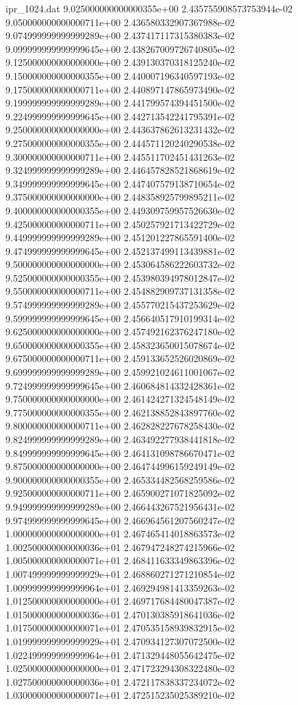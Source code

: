\begin{filecontents}{ipr_1024.dat}
9.025000000000000355e+00 2.435755908573753944e-02
9.050000000000000711e+00 2.436580332907367988e-02
9.074999999999999289e+00 2.437417117315380383e-02
9.099999999999999645e+00 2.438267009726740805e-02
9.125000000000000000e+00 2.439130370318125240e-02
9.150000000000000355e+00 2.440007196340597193e-02
9.175000000000000711e+00 2.440897147865973490e-02
9.199999999999999289e+00 2.441799574394451500e-02
9.224999999999999645e+00 2.442713542241795391e-02
9.250000000000000000e+00 2.443637862613231432e-02
9.275000000000000355e+00 2.444571120240290538e-02
9.300000000000000711e+00 2.445511702451431263e-02
9.324999999999999289e+00 2.446457828521868619e-02
9.349999999999999645e+00 2.447407579138710654e-02
9.375000000000000000e+00 2.448358925799895211e-02
9.400000000000000355e+00 2.449309759957526630e-02
9.425000000000000711e+00 2.450257921713422729e-02
9.449999999999999289e+00 2.451201227865591400e-02
9.474999999999999645e+00 2.452137499113439881e-02
9.500000000000000000e+00 2.453064586222603732e-02
9.525000000000000355e+00 2.453980394978012847e-02
9.550000000000000711e+00 2.454882909737131358e-02
9.574999999999999289e+00 2.455770215437253629e-02
9.599999999999999645e+00 2.456640517910199314e-02
9.625000000000000000e+00 2.457492162376247180e-02
9.650000000000000355e+00 2.458323650015078674e-02
9.675000000000000711e+00 2.459133652526020869e-02
9.699999999999999289e+00 2.459921024611001067e-02
9.724999999999999645e+00 2.460684814332428361e-02
9.750000000000000000e+00 2.461424271324548149e-02
9.775000000000000355e+00 2.462138852843897760e-02
9.800000000000000711e+00 2.462828227678258430e-02
9.824999999999999289e+00 2.463492277938441818e-02
9.849999999999999645e+00 2.464131098786670471e-02
9.875000000000000000e+00 2.464744996159249149e-02
9.900000000000000355e+00 2.465334482568259586e-02
9.925000000000000711e+00 2.465900271071825092e-02
9.949999999999999289e+00 2.466443267521956431e-02
9.974999999999999645e+00 2.466964561207560247e-02
1.000000000000000000e+01 2.467465414018863573e-02
1.002500000000000036e+01 2.467947248274215966e-02
1.005000000000000071e+01 2.468411633349863396e-02
1.007499999999999929e+01 2.468860271271210854e-02
1.009999999999999964e+01 2.469294981413359263e-02
1.012500000000000000e+01 2.469717684480047387e-02
1.015000000000000036e+01 2.470130385918641036e-02
1.017500000000000071e+01 2.470535158939832915e-02
1.019999999999999929e+01 2.470934127307072500e-02
1.022499999999999964e+01 2.471329448055642475e-02
1.025000000000000000e+01 2.471723294308322480e-02
1.027500000000000036e+01 2.472117838337234072e-02
1.030000000000000071e+01 2.472515235025389210e-02

\end{filecontents}
